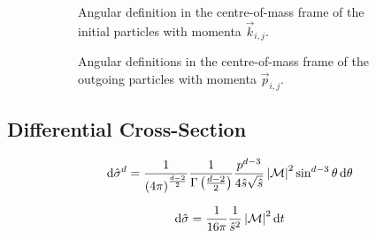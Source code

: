         \begin{figure}
            \centering
            \begin{subfigure}{.49\textwidth}
                \centering
                \caption{Angular definition in the centre-of-mass frame of the initial particles with momenta \(\vec{k}_{i,j}\).}
            \end{subfigure}
            \hfill
            \begin{subfigure}{.49\textwidth}
                \centering
                \caption{Angular definitions in the centre-of-mass frame of the outgoing particles with momenta \(\vec{p}_{i,j}\).}
            \end{subfigure}
            \caption{}
        \end{figure}


        
    \subsection{Differential Cross-Section}
        \begin{equation}
            \mathrm{d}\hat{\sigma}^d = \frac{1}{\left(4\pi\right)^{\frac{d-2}{2}}} \frac{1}{\Gamma\left(\frac{d-2}{2}\right)} \frac{p^{d-3}}{4\hat{s}\sqrt{\hat{s}}} \left|\mathcal{M}\right|^2 \sin^{d-3}\theta\, \mathrm{d}\theta
        \end{equation}

        \begin{equation}
            \mathrm{d}\hat{\sigma} = \frac{1}{16\pi} \frac{1}{\hat{s}^2} \left|\mathcal{M}\right|^2 \mathrm{d}t
        \end{equation}


